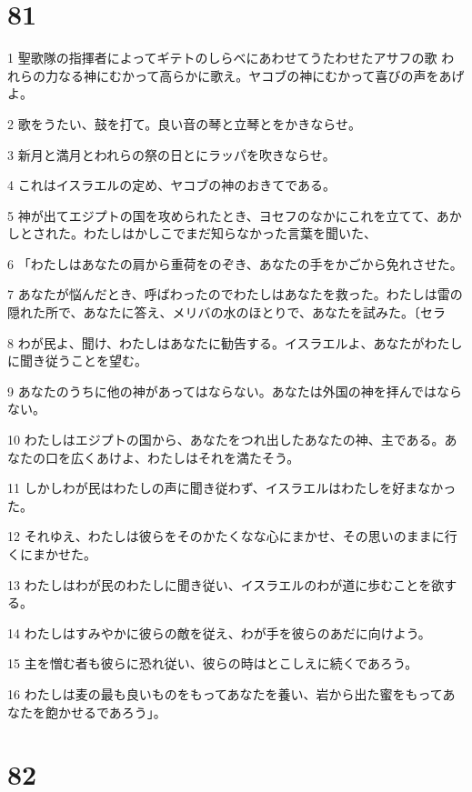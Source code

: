 \chapter{81}

\par 1 聖歌隊の指揮者によってギテトのしらべにあわせてうたわせたアサフの歌 われらの力なる神にむかって高らかに歌え。ヤコブの神にむかって喜びの声をあげよ。
\par 2 歌をうたい、鼓を打て。良い音の琴と立琴とをかきならせ。
\par 3 新月と満月とわれらの祭の日とにラッパを吹きならせ。
\par 4 これはイスラエルの定め、ヤコブの神のおきてである。
\par 5 神が出てエジプトの国を攻められたとき、ヨセフのなかにこれを立てて、あかしとされた。わたしはかしこでまだ知らなかった言葉を聞いた、
\par 6 「わたしはあなたの肩から重荷をのぞき、あなたの手をかごから免れさせた。
\par 7 あなたが悩んだとき、呼ばわったのでわたしはあなたを救った。わたしは雷の隠れた所で、あなたに答え、メリバの水のほとりで、あなたを試みた。〔セラ
\par 8 わが民よ、聞け、わたしはあなたに勧告する。イスラエルよ、あなたがわたしに聞き従うことを望む。
\par 9 あなたのうちに他の神があってはならない。あなたは外国の神を拝んではならない。
\par 10 わたしはエジプトの国から、あなたをつれ出したあなたの神、主である。あなたの口を広くあけよ、わたしはそれを満たそう。
\par 11 しかしわが民はわたしの声に聞き従わず、イスラエルはわたしを好まなかった。
\par 12 それゆえ、わたしは彼らをそのかたくなな心にまかせ、その思いのままに行くにまかせた。
\par 13 わたしはわが民のわたしに聞き従い、イスラエルのわが道に歩むことを欲する。
\par 14 わたしはすみやかに彼らの敵を従え、わが手を彼らのあだに向けよう。
\par 15 主を憎む者も彼らに恐れ従い、彼らの時はとこしえに続くであろう。
\par 16 わたしは麦の最も良いものをもってあなたを養い、岩から出た蜜をもってあなたを飽かせるであろう」。

\chapter{82}

